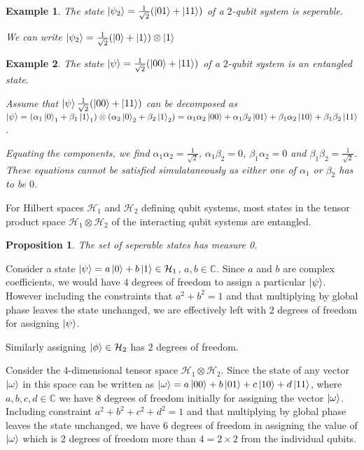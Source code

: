 \documentclass[12pt,twoside,fleqn]{report}
\makeatletter
\theoremstyle{thmstyle}
\renewenvironment{proof}[1][\proofname]{\par
\pushQED{\qed}%
\normalfont \topsep6\p@\@plus6\p@\relax
\trivlist
\item[\hskip\labelsep\itshape#1\@addpunct{.}]\mbox{}\par\nobreak\ignorespaces
}{%
    \popQED\endtrivlist\@endpefalse
    }
\newtheorem{eg}{Example}[chapter]
\newtheorem{prop}{Proposition}[chapter]
\makeatother
\begin{document}
\begin{eg}
The state $\ket{\psi_2} = \frac{1}{\sqrt{2}} (\ket{01} + \ket{11})$ of a $2$-qubit system is seperable. 

We can write $\ket{\psi_2} = \frac{1}{\sqrt{2}} (\ket{0} + \ket{1}) \otimes \ket{1}$
\end{eg}


\begin{eg}
The state $\ket{\psi} = \frac{1}{\sqrt{2}} (\ket{00} + \ket{11})$ of a $2$-qubit system is an entangled state.

    Assume that  $\ket{\psi} \frac{1}{\sqrt{2}} (\ket{00} + \ket{11}) $ can be decomposed as $\ket{\psi} = (\alpha_1 \ket{0}_1 + \beta_1 \ket{1}_1) \otimes (\alpha_2 \ket{0}_2 + \beta_2 \ket{1}_2) = \alpha_1 \alpha_2 \ket{00} + \alpha_1 \beta_2 \ket{01} + \beta_1 \alpha_2 \ket{10} + \beta_1 \beta_2 \ket{11}$.

    Equating the components, we find $\alpha_1 \alpha_2 = \displaystyle\frac{1}{\sqrt{2}}$, $\alpha_1 \beta_2 = 0$, $\beta_1 \alpha_2 = 0$ and $\beta_1 \beta_2 = \displaystyle\frac{1}{\sqrt{2}}$. These equations cannot be satisfied simulataneously as either one of $\alpha_1$ or $\beta_2$ has to be $0$.
\end{eg}


For Hilbert spaces $\mathcal{H}_1$ and $\mathcal{H}_2$ defining qubit systems, most states in the tensor product space $\mathcal{H}_1 \otimes \mathcal{H}_2$ of the interacting qubit systems are entangled.
\begin{prop}
    The set of seperable states has measure 0.
\end{prop}
\begin{proof}[intuition]
    Consider a state $\ket{\psi} = a \ket{0} + b \ket{1} \in \mathcal{H}_1$, $a,b \in \mathbb{C}$. Since $a$ and $b$ are complex coefficients, we would have $4$ degrees of freedom to assign a particular $\ket{\psi}$. However including the constraints that $a^2 + b^2 = 1$ and that multiplying by global phase leaves the state unchanged, we are effectively left with $2$ degrees of freedom for assigning $\ket{\psi}$. 
    
Similarly assigning $\ket{\phi} \in \mathcal{H}_2$ has $2$ degrees of freedom.

    Consider the $4$-dimensional tensor space $\mathcal{H}_1 \otimes \mathcal{H}_2$. Since the state of any vector $\ket{\omega}$ in this space can be written as $\ket{\omega} = a \ket{00} + b \ket{01} + c \ket{10} + d \ket{11}$, where $a, b, c, d \in \mathbb{C}$ we have $8$ degrees of freedom initially for assigning the vector $\ket{\omega}$. Including constraint $a^2 + b^2 + c^2 + d^2 = 1$ and that multiplying by global phase leaves the state unchanged, we have $6$ degrees of freedom in assigning the value of $\ket{\omega}$ which is $2$ degrees of freedom more than $4 = 2 \times 2$ from the individual qubits.
\end{proof}
\end{document}
